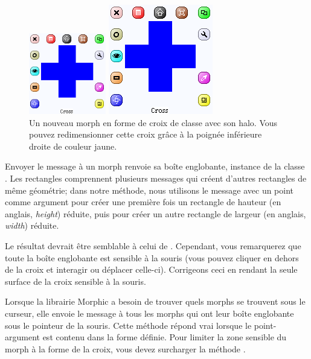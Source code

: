 \documentclass[a4paper,10pt,twoside]{book}
\begin{document}
\begin{figure}[hbt]
	\ifluluelse
		{\centerline{\includegraphics[width=0.3\textwidth]{NewCross}}}
		{\centerline{\includegraphics{NewCross}}}
	\caption{Un nouveau morph en forme de croix de classe
       avec son halo. Vous pouvez redimensionner cette
      croix grâce à la poignée inférieure droite
      de couleur jaune.}
\end{figure}

Envoyer le message  à un morph renvoie sa
boîte englobante, instance de la classe .  Les
rectangles comprennent plusieurs messages qui créent d'autres
rectangles de même géométrie; %
dans notre méthode, nous utilisons le message  avec un
point comme argument pour créer une première fois un rectangle de
hauteur (en anglais, \emph{height}) réduite, puis pour créer un
autre rectangle de largeur (en anglais, \emph{width}) réduite.

Le résultat devrait être semblable à celui de .
Cependant, vous remarquerez que toute la boîte englobante est
sensible à la souris (vous pouvez cliquer en dehors de la croix et
interagir ou déplacer celle-ci). Corrigeons ceci en rendant la seule
surface de la croix sensible à la souris.

Lorsque la librairie Morphic a besoin de trouver quels morphs se
trouvent sous le curseur, elle envoie le message 
 à tous les morphs qui ont leur boîte englobante sous le
pointeur de la souris. 
Cette méthode répond vrai lorsque le point-argument est contenu dans la
forme définie.
Pour limiter la zone sensible du morph à la forme de la croix, vous
devez surcharger la méthode .
\end{document}
